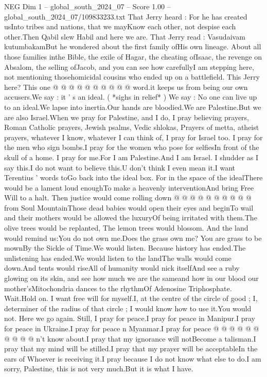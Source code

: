 \begin{textsample}{NEG Dim 1 – global\_south\_2024\_07 – Score 1.00 – global\_south\_2024\_07/109833233.txt}
That Jerry heard : For he has created usInto tribes and nations, that we mayKnow each other, not despise each other.Then Qabil slew Habil and here we are.
That Jerry read : Vasudaivam kutumbakamBut he wondered about the first family ofHis own lineage.
About all those families inthe Bible, the exile of Hagar, the cheating ofIsaac, the revenge on Absalom, the selling ofJacob, and you can see how carefullyI am stepping here, not mentioning thosehomicidal cousins who ended up on a battlefield.
This Jerry here?
This one @ @ @ @ @ @ @ @ @ @ word.it keeps us from being our own accusers.We say : it ' s an ideal. ( *sighs in relief* ) We say : No one can live up to an ideal.We lapse into inertia.Our hands are bloodied.We are Palestine.But we are also Israel.When we pray for Palestine, and I do, I pray believing prayers, Roman Catholic prayers, Jewish psalms, Vedic shlokas, Prayers of metta, atheist prayers, whatever I know, whatever I can think of, I pray for Israel too.
I pray for the men who sign bombs.I pray for the women who pose for selfiesIn front of the skull of a home.
I pray for me.For I am Palestine.And I am Israel.
I shudder as I say this.I do not want to believe this.U don't think I even mean it.I want Terentius ' words toGo back into the ideal box.
For in the space of the idealThere would be a lament loud enoughTo make a heavenly interventionAnd bring Free Will to a halt.
Then justice would come rolling down @ @ @ @ @ @ @ @ @ @ from Soul MountainThose dead babies would open their eyes and beginTo wail and their mothers would be allowed the luxuryOf being irritated with them.The olive trees would be replanted, The lemon trees would blossom.
And the land would remind us:You do not own me.Does the grass own me?
You are grass to be mownBy the Sickle of Time.We would listen.
Because history has ended.The unlistening has ended.We would listen to the landThe walls would come down.And tents would riseAll of humanity would nick itselfAnd see a ruby glowing on its skin, and see how much we are the sameand how in our blood our mother'sMitochondria dances to the rhythmOf Adenosine Triphosphate.
Wait.Hold on.
I want free will for myself.I, at the centre of the circle of good ; I, determiner of the radius of that circle ; I would know how to use it.You would not.
Here we go again.
Still, I pray for peace.I pray for peace in Manipur.I pray for peace in Ukraine.I pray for peace n Myanmar.I pray for peace @ @ @ @ @ @ @ @ @ @ n't know about.I pray that my ignorance will notBecome a talisman.I pray that my mind will be stilled.I pray that my prayer will be acceptableIn the ears of Whoever is receiving it.I pray because I do not know what else to do.I am sorry, Palestine, this is not very much.But it is what I have.

\end{textsample}
